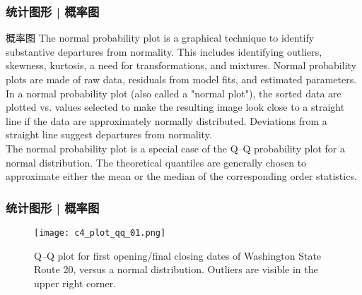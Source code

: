 \begin{frame}
  \frametitle{统计图形 | 概率图}
  \begin{block}{概率图}
    The normal probability plot is a graphical technique to identify substantive departures from normality. This includes identifying outliers, skewness, kurtosis, a need for transformations, and mixtures. Normal probability plots are made of raw data, residuals from model fits, and estimated parameters.\\
    \vspace{0.5em}
    In a normal probability plot (also called a "normal plot"), the sorted data are plotted vs. values selected to make the resulting image look close to a straight line if the data are approximately normally distributed. Deviations from a straight line suggest departures from normality.\\
    \vspace{0.5em}
The normal probability plot is a special case of the Q–Q probability plot for a normal distribution. The theoretical quantiles are generally chosen to approximate either the mean or the median of the corresponding order statistics.
  \end{block}
\end{frame}

\begin{frame}
  \frametitle{统计图形 | 概率图}
  \begin{figure}
    \centering
    \texttt{[image: c4\_plot\_qq\_01.png]}
    \caption{Q–Q plot for first opening/final closing dates of Washington State Route 20, versus a normal distribution. Outliers are visible in the upper right corner.}
  \end{figure}
\end{frame}

